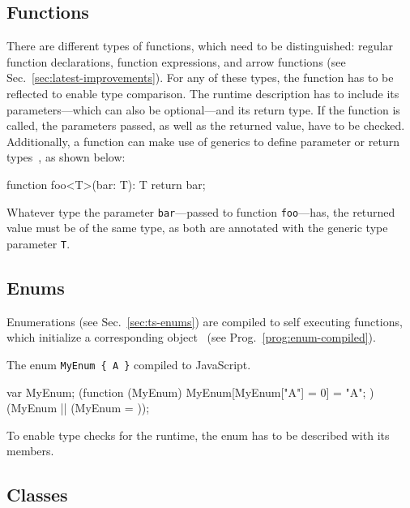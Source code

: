 
\subsection{Functions}

There are different types of functions, which need to be distinguished: regular function declarations, function expressions, and arrow functions (see Sec.~\ref{sec:latest-improvements}). For any of these types, the function has to be reflected to enable type comparison. The runtime description has to include its parameters---which can also be optional---and its return type. If the function is called, the parameters passed, as well as the returned value, have to be checked. Additionally, a function can make use of generics to define parameter or return types~\cite{TypeScriptHandbook:Generics}, as shown below:
\begin{JsCode}[numbers=none]
function foo<T>(bar: T): T {
  return bar;
} 
\end{JsCode}
Whatever type the parameter \texttt{bar}---passed to function \texttt{foo}---has, the returned value must be of the same type, as both are annotated with the generic type parameter \texttt{T}.

\subsection{Enums}

Enumerations (see Sec.~\ref{sec:ts-enums}) are compiled to self executing functions, which initialize a corresponding object~\cite{TypeScriptHandbook:Enums} (see Prog.~\ref{prog:enum-compiled}).
\begin{program}
\caption{The enum \texttt{MyEnum \{ A \}} compiled to JavaScript.~\cite{TypeScriptHandbook:Enums}}
\label{prog:enum-compiled}
\begin{JsCode}
var MyEnum;
(function (MyEnum) {
    MyEnum[MyEnum["A"] = 0] = "A";
})(MyEnum || (MyEnum = {}));
\end{JsCode}
\end{program}
To enable type checks for the runtime, the enum has to be described with its members.%

\subsection{Classes}

